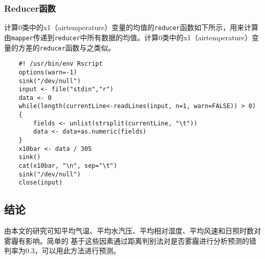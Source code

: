 \subsubsection{Reducer函数}\label{reducerux51fdux6570}

计算0类中的x1（airtemperature）变量的均值的\lstinline!reducer!函数如下所示，用来计算由\lstinline!mapper!传递到\lstinline!reducer!中所有数据的均值。计算0类中的x1（airtemperature）变量的方差的\lstinline|reducer|函数与之类似。

\begin{lstlisting}
	#! /usr/bin/env Rscript
	options(warn=-1)
	sink("/dev/null")
	input <- file("stdin","r")
	data <- 0
	while(length(currentLine<-readLines(input, n=1, warn=FALSE)) > 0)   
	{
	    fields <- unlist(strsplit(currentLine, "\t"))
	    data <- data+as.numeric(fields)
	}
	x10bar <- data / 305
	sink()
	cat(x10bar, "\n", sep="\t")
	sink("/dev/null")
	close(input)
\end{lstlisting}

\subsection{结论}\label{ux7ed3ux8bba}

由本文的研究可知平均气温、平均水汽压、平均相对湿度、平均风速和日照时数对雾霾有影响。简单的
基于这些因素通过距离判别法对是否雾霾进行分析预测的错判率为0.3，可以用此方法进行预测。
